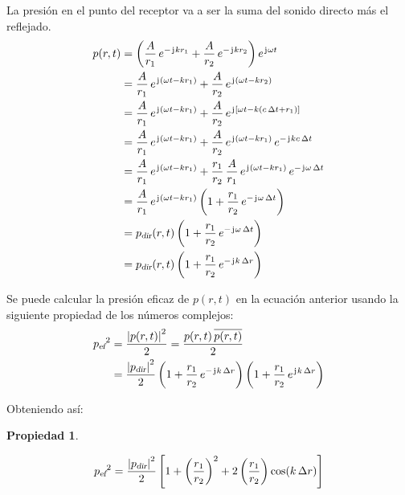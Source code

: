 \documentclass[a5paper,12pt,twoside]{book}
\newtheorem{prop}{{Propiedad}}[chapter]
\begin{document}
La presión en el punto del receptor va a ser la suma del sonido directo más el reflejado.
\begin{align*}
    p(r,t) &= \left( \frac{A}{r_1} \, e^{-\mkern2mu\mathrm{j}\mkern1mu k r_1} + \frac{A}{r_2} \, e^{-\mkern2mu\mathrm{j}\mkern1mu k r_2} \right) e^{\mkern2mu\mathrm{j}\mkern1mu \omega t}
    \\
    &= \frac{A}{r_1} \, e^{\mkern2mu\mathrm{j}\mkern1mu(\omega t - k r_1)} + \frac{A}{r_2} \, e^{\mkern2mu\mathrm{j}\mkern1mu(\omega t - k r_2)}
    \\
    &= \frac{A}{r_1} \, e^{\mkern2mu\mathrm{j}\mkern1mu(\omega t - k r_1)} + \frac{A}{r_2} \, e^{\mkern2mu\mathrm{j}\mkern1mu[\omega t - k (c \, \Delta t + r_1)]}
    \\
    &= \frac{A}{r_1} \, e^{\mkern2mu\mathrm{j}\mkern1mu(\omega t - k r_1)} + \frac{A}{r_2} \, e^{\mkern2mu\mathrm{j}\mkern1mu(\omega t - k r_1)} \, e^{-\mkern2mu\mathrm{j}\mkern1mu k c \, \Delta t}
    \\
    &= \frac{A}{r_1} \, e^{\mkern2mu\mathrm{j}\mkern1mu(\omega t - k r_1)} + \frac{r_1}{r_2} \, \frac{A}{r_1} \, e^{\mkern2mu\mathrm{j}\mkern1mu(\omega t - k r_1)} \, e^{-\mkern2mu\mathrm{j}\mkern1mu \omega \, \Delta t}
    \\
    &= \frac{A}{r_1} \, e^{\mkern2mu\mathrm{j}\mkern1mu(\omega t - k r_1)} \left( 1 + \frac{r_1}{r_2} \, e^{-\mkern2mu\mathrm{j}\mkern1mu \omega \, \Delta t} \right)
    \\
    &= {{p}_\textsl{{dir}}} (r,t) \left( 1 + \frac{r_1}{r_2} \, e^{-\mkern2mu\mathrm{j}\mkern1mu \omega \, \Delta t} \right)
    \\
    &= {{p}_\textsl{{dir}}} (r,t) \left( 1 + \frac{r_1}{r_2} \, e^{-\mkern2mu\mathrm{j}\mkern1mu k \, \Delta r} \right)
\end{align*}

Se puede calcular la presión eficaz de $p(r,t)$ en la ecuación anterior usando la siguiente propiedad de los números complejos:
\begin{align*}
    {{{p}_\textsl{{ef}}}}^2 &= \frac{{\left| {p(r,t)} \right|}^2}{2} = \frac{p(r,t) \, \overline{p(r,t)}}{2}
    \\
    &= \frac{{\left| {{{p}_\textsl{{dir}}}} \right|}^2}{2} \left( 1 + \frac{r_1}{r_2} \, e^{-\mkern2mu\mathrm{j}\mkern1mu k \, \Delta r} \right) \left( 1 + \frac{r_1}{r_2} \, e^{\mkern2mu\mathrm{j}\mkern1mu k \, \Delta r} \right)
\end{align*}

Obteniendo así:

\begin{mdframed}[style=PropertyFrame]
    \begin{prop}
    \end{prop}
    \begin{equation*}
        {{{p}_\textsl{{ef}}}}^2 = \frac{{\left| {{{p}_\textsl{{dir}}}} \right|}^2}{2} \left[ 1 + \left(\frac{r_1}{r_2}\right)^2 + 2 \left(\frac{r_1}{r_2}\right) \cos (k \, \Delta r) \right]
    \end{equation*}
\end{mdframed}
\end{document}
